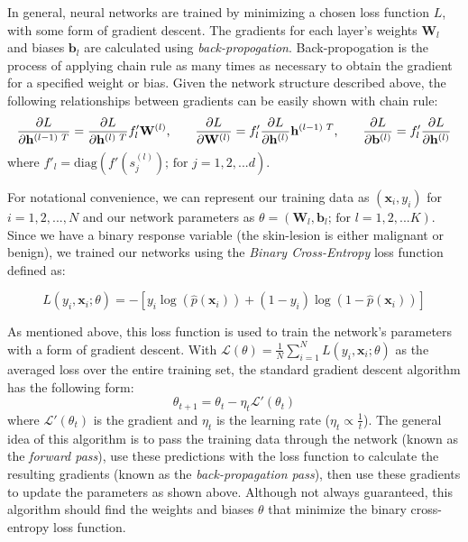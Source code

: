 \documentclass [MAS] {uclathes}
\begin{document}
In general, neural networks are trained by minimizing a chosen loss function $L$, with some form of gradient descent. The gradients for each layer's weights $\mathbf{W}_l$ and biases $\mathbf{b}_l$ are calculated using \textit{back-propogation}. Back-propogation is the process of applying chain rule as many times as necessary to obtain the gradient for a specified weight or bias. Given the network structure described above, the following relationships between gradients can be easily shown with chain rule:
$$\frac{\partial L}{\partial \mathbf{h}^{(l-1) \text{ }T}} = \frac{\partial L}{\partial \mathbf{h}^{(l) \text{ }T}} f'_{l} \mathbf{W}^{(l)} \text{,\quad \quad} \frac{\partial L}{\partial \mathbf{W}^{(l)}} = f'_{l} \frac{\partial L}{\partial \mathbf{h}^{(l)}}\mathbf{h}^{(l-1) \text{ }T} \text{,\quad \quad} \frac{\partial L}{\partial \mathbf{b}^{(l)}} = f'_{l} \frac{\partial L}{\partial \mathbf{h}^{(l)}}$$ where $f'_{l} = \text{diag}(f'(s^{(l)}_{j})  \text{; for } j = 1, 2, ... d)$.


For notational convenience, we can represent our training data as $(\mathbf{x}_i, y_i)$ for $i = 1, 2, ..., N$ and our network parameters as $\theta = (\mathbf{W}_l, \mathbf{b}_l  \text{; for } l = 1, 2, ... K)$. Since we have a binary response variable (the skin-lesion is either malignant or benign), we trained our networks using the \textit{Binary Cross-Entropy} loss function defined as: 

$$L(y_i, \mathbf{x}_i; \theta) = - \left[ y_i\log(\hat{p}(\mathbf{x}_i)) + (1 - y_i)\log(1 - \hat{p}(\mathbf{x}_i)) \right]$$ 

As mentioned above, this loss function is used to train the network's parameters with a form of gradient descent. With $\mathcal{L}(\theta) = \frac{1}{N} \sum_{i=1}^{N} L(y_i, \mathbf{x}_i; \theta)$ as the averaged loss over the entire training set, the standard gradient descent algorithm has the following form: $$\theta_{t+1} = \theta_{t} - \eta_t \mathcal{L}'(\theta_t)$$ where $\mathcal{L}'(\theta_t)$ is the gradient and $\eta_t$ is the learning rate ($\eta_t \propto \frac{1}{t}$). The general idea of this algorithm is to pass the training data through the network (known as the \textit{forward pass}), use these predictions with the loss function to calculate the resulting gradients (known as the \textit{back-propagation pass}), then use these gradients to update the parameters as shown above. Although not always guaranteed, this algorithm should find the weights and biases $\theta$ that minimize the binary cross-entropy loss function. 
\end{document}

